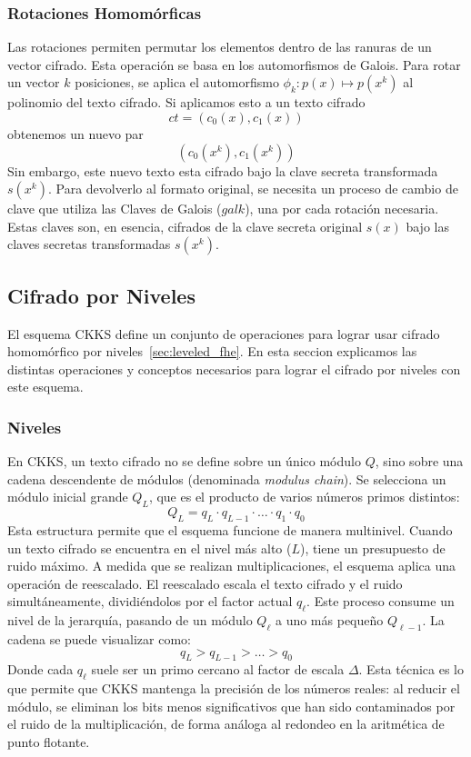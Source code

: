 \subsubsection{Rotaciones Homomórficas}

Las rotaciones permiten permutar los elementos dentro de las ranuras de un vector cifrado. Esta operación se basa en los automorfismos de Galois. Para rotar un vector $k$ posiciones, se aplica el automorfismo $\phi_k: p(x) \mapsto p(x^k)$ al polinomio del texto cifrado. Si aplicamos esto a un texto cifrado $$ct = (c_0(x), c_1(x))$$ obtenemos un nuevo par $$(c_0(x^k), c_1(x^k))$$ Sin embargo, este nuevo texto esta cifrado bajo la clave secreta transformada $s(x^k)$. Para devolverlo al formato original, se necesita un proceso de cambio de clave que utiliza las Claves de Galois ($galk$), una por cada rotación necesaria. Estas claves son, en esencia, cifrados de la clave secreta original $s(x)$ bajo las claves secretas transformadas $s(x^k)$.


\subsection{Cifrado por Niveles}\label{sec:gestion_niveles}

El esquema CKKS define un conjunto de operaciones para lograr usar cifrado homomórfico por niveles~\ref{sec:leveled_fhe}. En esta seccion explicamos las distintas operaciones y conceptos necesarios para lograr el cifrado por niveles con este esquema.

\subsubsection{Niveles}

En CKKS, un texto cifrado no se define sobre un único módulo $Q$, sino sobre una cadena descendente de módulos (denominada \textit{modulus chain}). Se selecciona un módulo inicial grande $Q_L$, que es el producto de varios números primos distintos:$$ Q_L = q_L \cdot q_{L-1} \cdot \dots \cdot q_1 \cdot q_0 $$Esta estructura permite que el esquema funcione de manera multinivel. Cuando un texto cifrado se encuentra en el nivel más alto ($L$), tiene un presupuesto de ruido máximo. A medida que se realizan multiplicaciones, el esquema aplica una operación de reescalado. El reescalado escala el texto cifrado y el ruido simultáneamente, dividiéndolos por el factor actual $q_\ell$. Este proceso consume un nivel de la jerarquía, pasando de un módulo $Q_\ell$ a uno más pequeño $Q_{\ell-1}$. La cadena se puede visualizar como:$$ q_L > q_{L-1} > \dots > q_0 $$Donde cada $q_\ell$ suele ser un primo cercano al factor de escala $\Delta$. Esta técnica es lo que permite que CKKS mantenga la precisión de los números reales: al reducir el módulo, se eliminan los bits menos significativos que han sido contaminados por el ruido de la multiplicación, de forma análoga al redondeo en la aritmética de punto flotante.

